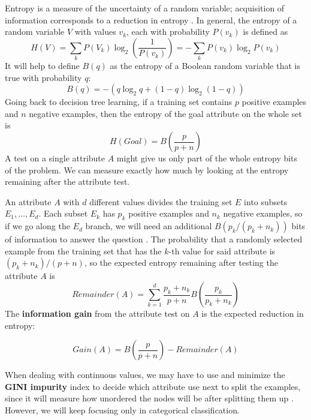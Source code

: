 \documentclass[10pt]{article}
\begin{document}
Entropy is a measure of the uncertainty of a random variable; acquisition of information corresponds to a reduction in entropy \cite{ai}. In general, the entropy of a random variable $V$ with values $v_{k}$, each with probability $P(v_{k})$ is defined as
\begin{equation*}
    H(V) = \sum_{k}P(V_{k})\log_{2}\left(\frac{1}{P(v_{k})}\right) = - \sum_{k}P(v_{k})\log_{2}P(v_{k})
\end{equation*}
It will help to define $B(q)$ as the entropy of a Boolean random variable that is true with probability $q$:
\begin{equation*}
    B(q) = -(q\log_{2}q + (1-q)\log_{2}(1-q))
\end{equation*}
Going back to decision tree learning, if a training set contains $p$ positive examples and $n$ negative examples, then the entropy of the goal attribute on the whole set is
\begin{equation*}
    H(Goal) = B\left(\frac{p}{p+n}\right)
\end{equation*}
A test on a single attribute $A$ might give us only part of the whole entropy bits of the problem. We can measure exactly how much by looking at the entropy remaining after the attribute test. \par
An attribute $A$ with $d$ different values divides the training set $E$ into subsets $E_{1}, \dots, E_{d}$. Each subset $E_{k}$ has $p_{k}$ positive examples and $n_{k}$ negative examples, so if we go along the $E_{d}$ branch, we will need an additional $B(p_{k}/(p_{k}+n_{k}))$ bits of information to answer the question \cite{ai}. The probability that a randomly selected example from the training set that has the $k$-th value for said attribute is $(p_{k}+n_{k})/(p+n)$, so the expected entropy remaining after testing the attribute $A$ is
\begin{equation*}
    Remainder(A) = \sum_{k=1}^{d}\frac{p_{k}+n_{k}}{p+n}B\left(\frac{p_{k}}{p_{k}+n_{k}}\right)
\end{equation*}
The \textbf{information gain} from the attribute test on $A$ is the expected reduction in entropy: \par
\begin{equation*}
    Gain(A) = B\left(\frac{p}{p+n}\right) - Remainder(A)
\end{equation*} \par
When dealing with continuous values, we may have to use and minimize the \textbf{GINI impurity} index to decide which attribute use next to split the examples, since it will measure how unordered the nodes will be after splitting them up \cite{aprendeML}. However, we will keep focusing only in categorical classification.
\end{document}
